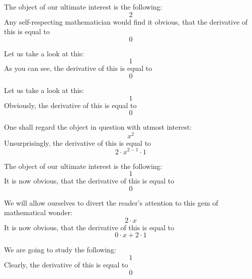 \documentclass{article}
\begin{document}
The object of our ultimate interest is the following:
\begin{equation}
2 
\end{equation}
Any self-respecting mathematician would find it obvious, that the derivative of this is equal to
\begin{equation}
0 
\end{equation}

Let us take a look at this:
\begin{equation}
1 
\end{equation}
As you can see, the derivative of this is equal to
\begin{equation}
0 
\end{equation}

Let us take a look at this:
\begin{equation}
1 
\end{equation}
Obviously, the derivative of this is equal to
\begin{equation}
0 
\end{equation}

One shall regard the object in question with utmost interest:
\begin{equation}
x ^{2 } 
\end{equation}
Unsurprisingly, the derivative of this is equal to
\begin{equation}
2 \cdot x ^{2 - 1 } \cdot 1 
\end{equation}

The object of our ultimate interest is the following:
\begin{equation}
1 
\end{equation}
It is now obvious, that the derivative of this is equal to
\begin{equation}
0 
\end{equation}

We will allow ourselves to divert the reader's attention to this gem of mathematical wonder:
\begin{equation}
2 \cdot x 
\end{equation}
It is now obvious, that the derivative of this is equal to
\begin{equation}
0 \cdot x + 2 \cdot 1 
\end{equation}

We are going to study the following:
\begin{equation}
1 
\end{equation}
Clearly, the derivative of this is equal to
\begin{equation}
0 
\end{equation}
\end{document}
